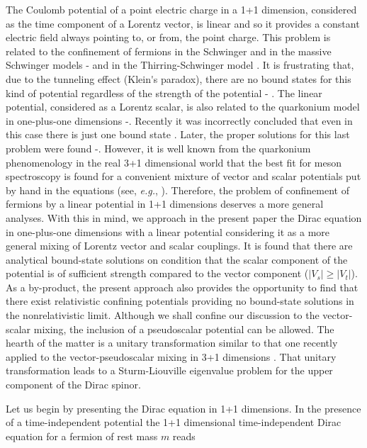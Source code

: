 \documentclass[a4paper,12pt,titlepage]{article}
\begin{document}
The Coulomb potential of a point electric charge in a 1+1 dimension,
considered as the time component of a Lorentz vector, is linear and so it
provides a constant electric field always pointing to, or from, the point
charge. This problem is related to the confinement of fermions in the
Schwinger and in the massive Schwinger models \cite{col1}-\cite{col2} and in
the Thirring-Schwinger model \cite{fro}. It is frustrating that, due to the
tunneling effect (Klein\'{}s paradox), there are no bound states for this
kind of potential regardless of the strength of the potential \cite{cap}-%
\cite{gal}. The linear potential, considered as a Lorentz scalar, is also
related to the quarkonium model in one-plus-one dimensions \cite{hoo}-\cite
{kog}. Recently it was incorrectly concluded that even in this case there
is just one bound state \cite{bha}.
Later, the proper solutions for this last problem were found \cite{cas}-\cite
{hil}. However, it is well known from the quarkonium phenomenology in the
real 3+1 dimensional world that the best fit for meson spectroscopy is found
for a convenient mixture of vector and scalar potentials put by hand in the
equations (see, \textit{e.g.}, \cite{luc}). Therefore, the problem of
confinement of fermions by a linear potential in 1+1 dimensions deserves a
more general analyses. With this in mind, we approach in the present paper
the Dirac equation in one-plus-one dimensions with a linear potential
considering it as a more general mixing of Lorentz vector and scalar
couplings. It is found that there are analytical bound-state solutions on
condition that the scalar component of the potential is of sufficient
strength compared to the vector component ($|V_{s}|\geq |V_{t}|$). As a
by-product, the present approach also provides the opportunity to find that
there exist relativistic confining potentials providing no bound-state
solutions in the nonrelativistic limit. Although we shall confine our
discussion to the vector-scalar mixing, the inclusion of a pseudoscalar
potential can be allowed. The hearth of the matter is a unitary
transformation similar to that one recently applied to the
vector-pseudoscalar mixing in 3+1 dimensions \cite{vai}. That unitary
transformation leads to a Sturm-Liouville eigenvalue problem for the upper
component of the Dirac spinor.

Let us begin by presenting the Dirac equation in 1+1 dimensions. In the
presence of a time-independent potential the 1+1 dimensional
time-independent Dirac equation for a fermion of rest mass $m$ reads
\end{document}
